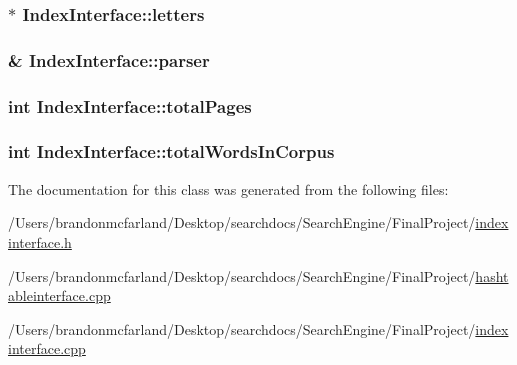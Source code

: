 \subsubsection[{letters}]{$\ast$ Index\+Interface\+::letters\hspace{0.3cm}{\ttfamily [protected]}}\label{class_index_interface_a8511509bb58da989f705ba75fd5dde2d}
\hypertarget{class_index_interface_a42b0d9eccd309185ed92976f72908bb9}{}
\subsubsection[{parser}]{\& Index\+Interface\+::parser\hspace{0.3cm}{\ttfamily [protected]}}\label{class_index_interface_a42b0d9eccd309185ed92976f72908bb9}
\hypertarget{class_index_interface_a2df695d2b504f2e53a0bfdd6bfee31da}{}
\subsubsection[{total\+Pages}]{\setlength{\rightskip}{0pt plus 5cm}int Index\+Interface\+::total\+Pages\hspace{0.3cm}{\ttfamily [protected]}}\label{class_index_interface_a2df695d2b504f2e53a0bfdd6bfee31da}
\hypertarget{class_index_interface_ab607b430e78528cdb8bb79ba4afa91d2}{}
\subsubsection[{total\+Words\+In\+Corpus}]{\setlength{\rightskip}{0pt plus 5cm}int Index\+Interface\+::total\+Words\+In\+Corpus\hspace{0.3cm}{\ttfamily [protected]}}\label{class_index_interface_ab607b430e78528cdb8bb79ba4afa91d2}


The documentation for this class was generated from the following files\+:\begin{DoxyCompactItemize}
\item 
/\+Users/brandonmcfarland/\+Desktop/searchdocs/\+Search\+Engine/\+Final\+Project/\hyperlink{indexinterface_8h}{indexinterface.\+h}\item 
/\+Users/brandonmcfarland/\+Desktop/searchdocs/\+Search\+Engine/\+Final\+Project/\hyperlink{hashtableinterface_8cpp}{hashtableinterface.\+cpp}\item 
/\+Users/brandonmcfarland/\+Desktop/searchdocs/\+Search\+Engine/\+Final\+Project/\hyperlink{indexinterface_8cpp}{indexinterface.\+cpp}\end{DoxyCompactItemize}
